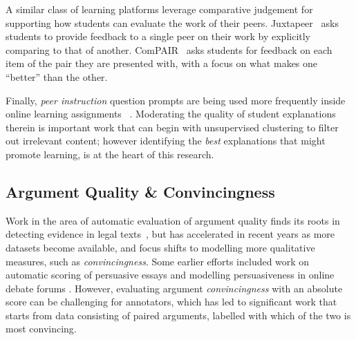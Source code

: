 \documentclass[runningheads]{llncs}
\begin{document}
A similar class of learning platforms leverage comparative judgement for 
supporting how students can evaluate the work of their peers. 
Juxtapeer~\cite{cambre_juxtapeer:_2018} asks students to provide feedback to a 
single peer on their work by explicitly comparing to that of another.
ComPAIR~\cite{potter_compair:_2017} asks students for feedback on each item of 
the pair they are presented with, with a focus on what makes one ``better'' 
than the other.

Finally, \textit{peer instruction} question prompts are being used more 
frequently inside online learning 
assignments~\cite{univeristy_of_british_columbia_ubc/ubcpi_2019}
\cite{charles_harnessing_2019}.
Moderating the quality of student explanations therein is important work that 
can begin with unsupervised clustering to filter out irrelevant 
content\cite{gagnon_filtering_2019}; however identifying the \textit{best} 
explanations that might promote learning, is at the heart of this research.


\subsection{Argument Quality \& Convincingness}

Work in the area of automatic evaluation of argument quality finds its roots in 
detecting evidence in legal texts~\cite{moens_automatic_2007}, but has 
accelerated in recent years as more datasets become available, and focus shifts 
to modelling more qualitative measures, such as \textit{convincingness}. 
Some earlier efforts included work on automatic scoring of persuasive essays 
\cite{persing_end--end_2016} and modelling persuasiveness in online debate 
forums \cite{tan_winning_2016}. 
However, evaluating argument \textit{convincingness} with an absolute score can 
be challenging for annotators, which has led to significant work that starts 
from data consisting of paired arguments, labelled with which of the two is 
most convincing.
\end{document}
